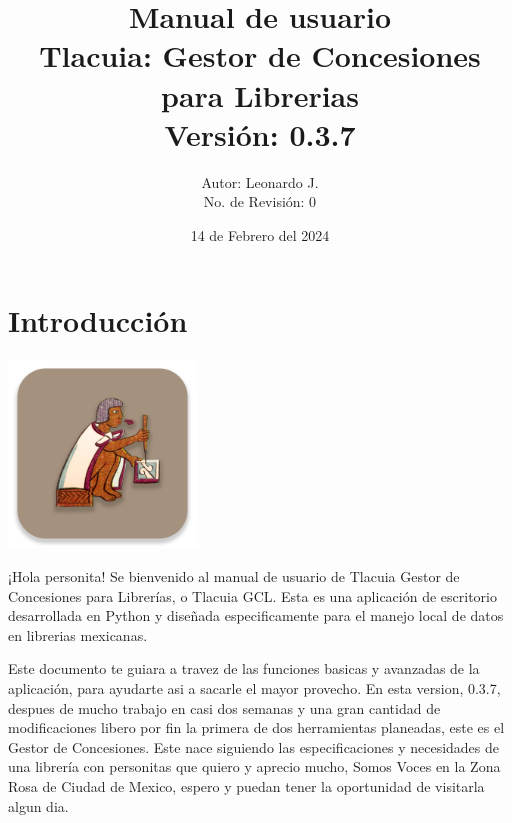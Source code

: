\documentclass[12pt, letterpaper]{article}
\title{
    \vspace*{3cm}
    \textbf{Manual de usuario}\\[1cm]
    \Large\textbf{Tlacuia: Gestor de Concesiones para Librerias}\\[0.5cm]
    \large Versión: 0.3.7
}
\author{
    Autor: Leonardo J.\\
    No. de Revisión: 0
}
\date{
    14 de Febrero del 2024
}
\begin{document}
\maketitle
\thispagestyle{empty} %
\newpage

\tableofcontents
\newpage

\section{Introducción}

\begin{center}
    \includegraphics[width = 5cm]{TlacuiaLogo.png}
\end{center}

¡Hola personita! Se bienvenido al manual de usuario de Tlacuia Gestor de Concesiones para Librerías, o Tlacuia GCL. Esta es una
aplicación de escritorio desarrollada en Python y diseñada especificamente para el manejo local de datos en librerias mexicanas.  

Este documento te guiara a travez de las funciones basicas y avanzadas de la aplicación, para ayudarte asi a sacarle el mayor 
provecho. En esta version, 0.3.7, despues de mucho trabajo en casi dos semanas y una gran cantidad de modificaciones libero por 
fin la primera de dos herramientas planeadas, este es el Gestor de Concesiones. Este nace siguiendo las especificaciones y 
necesidades de una librería con personitas que quiero y aprecio mucho, Somos Voces en la Zona Rosa de Ciudad de Mexico, 
espero y puedan tener la oportunidad de visitarla algun dia.  
\end{document}
